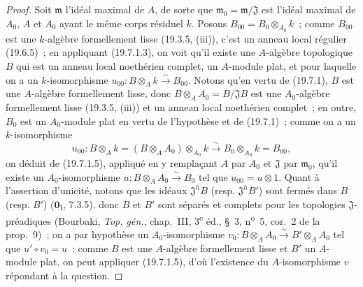 \begin{proof}
Soit $\mathfrak m$ l'idéal maximal de $A$, de sorte que
$\mathfrak m_0=\mathfrak m/\mathfrak J$ est l'idéal maximal de $A_0$, $A$ et
$A_0$ ayant le même corps résiduel $k$. Posons
$B_{00}=B_0\otimes_{A_0}k$~; comme $B_{00}$ est une $k$-algèbre formellement
lisse (19.3.5, (iii)), c'est un anneau local régulier (19.6.5)~; en appliquant
(19.7.1.3), on voit qu'il existe une $A$-algèbre topologique $B$ qui est un
anneau local noethérien complet, un $A$-module plat, et pour laquelle on a un
$k$-isomorphisme
$u_{00}:B\otimes_A k\xrightarrow{\sim}B_{00}$. Notons qu'en vertu de (19.7.1),
$B$ est une $A$-algèbre formellement lisse, donc
$B\otimes_A A_0=B/\mathfrak JB$ est une $A_0$-algèbre formellement lisse
(19.3.5, (iii)) et un anneau local noethérien complet~; en outre, $B_0$ est un
$A_0$-module plat en vertu de l'hypothèse et de (19.7.1)~; comme on a un
$k$-isomorphisme
\[
  u_{00}:B\otimes_A k=(B\otimes_A A_0)\otimes_{A_0}k
  \xrightarrow{\sim}B_0\otimes_{A_0}k=B_{00},
\]
on déduit de (19.7.1.5), appliqué en y remplaçant $A$ par $A_0$ et
$\mathfrak J$ par $\mathfrak m_0$, qu'il existe un $A_0$-isomorphisme
$u:B\otimes_A A_0\xrightarrow{\sim}B_0$ tel que $u_{00}=u\otimes1$. Quant à
l'assertion d'unicité, notons que les idéaux $\mathfrak J^hB$ (resp.
$\mathfrak J^hB'$) sont fermés dans $B$ (resp. $B'$)
($\mathbf 0_{\mathrm I}$, 7.3.5), donc $B$ et $B'$ sont séparés et complets
pour les topologies $\mathfrak J$-préadiques (Bourbaki, \emph{Top. gén.},
chap.~III, 3\textsuperscript{e} éd., §~3, n\textsuperscript{o}~5, cor.~2 de la
prop.~9)~; on a par hypothèse un $A_0$-isomorphisme
$v_0:B\otimes_A A_0\xrightarrow{\sim}B'\otimes_A A_0$ tel que
$u'\circ v_0=u$~; comme $B$ est une $A$-algèbre formellement lisse et $B'$ un
$A$-module plat, on peut appliquer (19.7.1.5), d'où l'existence du
$A$-isomorphisme $v$ répondant à la question.
\end{proof}

